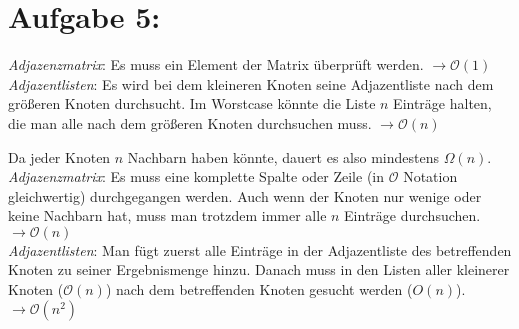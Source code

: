 \documentclass[11pt]{scrartcl}  %
\begin{document}
\section*{Aufgabe 5:}
\begin{compactenum}[(a)]

\item
  \emph{Adjazenzmatrix}: Es muss ein Element der Matrix überprüft werden. $\rightarrow \mathcal O(1)$\\[0.1cm]
  \emph{Adjazentlisten}: Es wird bei dem kleineren Knoten seine Adjazentliste nach dem größeren Knoten durchsucht. Im Worstcase könnte die Liste $n$ Einträge halten, die man alle nach dem größeren Knoten durchsuchen muss. $\rightarrow \mathcal O(n)$\\
\item
  Da jeder Knoten $n$ Nachbarn haben könnte, dauert es also mindestens $\Omega(n)$.\\[0.2cm]
  \emph{Adjazenzmatrix}: Es muss eine komplette Spalte oder Zeile (in $\mathcal O$ Notation gleichwertig) durchgegangen werden. Auch wenn der Knoten nur wenige oder keine Nachbarn hat, muss man trotzdem immer alle $n$ Einträge durchsuchen. $\rightarrow \mathcal O(n)$\\[0.1cm]
  \emph{Adjazentlisten}: Man fügt zuerst alle Einträge in der Adjazentliste des betreffenden Knoten zu seiner Ergebnismenge hinzu. Danach muss in den Listen aller kleinerer Knoten ($\mathcal O(n)$) nach dem betreffenden Knoten gesucht werden ($O(n)$). $\rightarrow \mathcal O(n^2)$
\end{compactenum}
\end{document}
